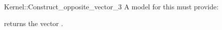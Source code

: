 \begin{ccRefFunctionObjectConcept}{Kernel::Construct_opposite_vector_3}
A model for this must provide:


{returns the vector .}

\ccIsModel{}

\end{ccRefFunctionObjectConcept}
